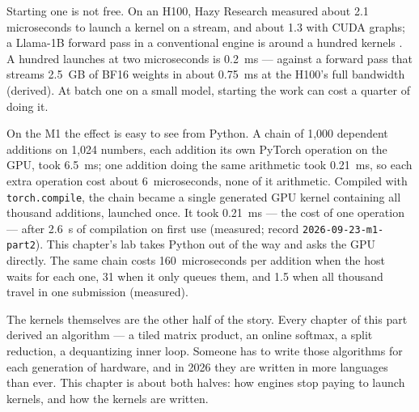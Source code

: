 Starting one is not free. On an H100, Hazy Research measured about 2.1
microseconds to launch a kernel on a stream, and about 1.3 with CUDA graphs;
a Llama-1B forward pass in a conventional engine is around a hundred kernels
\cite{spector2025megakernel}. A hundred launches at two microseconds is
0.2~ms --- against a forward pass that streams 2.5~GB of BF16 weights in about
0.75~ms at the H100's full bandwidth (derived). At batch one on a small model,
starting the work can cost a quarter of doing it.

On the M1 the effect is easy to see from Python. A chain of 1,000 dependent
additions on 1,024 numbers, each addition its own PyTorch operation on the
GPU, took 6.5~ms; one addition doing the same arithmetic took 0.21~ms, so each
extra operation cost about 6~microseconds, none of it arithmetic. Compiled
with \texttt{torch.compile}, the chain became a single generated GPU kernel
containing all thousand additions, launched once. It took 0.21~ms --- the cost
of one operation --- after 2.6~s of compilation on first use (measured; record
\texttt{2026-09-23-m1-part2}). This chapter's lab takes Python out of the way
and asks the GPU directly. The same chain costs 160~microseconds per addition
when the host waits for each one, 31 when it only queues them, and 1.5 when all
thousand travel in one submission (measured).

The kernels themselves are the other half of the story. Every chapter of this
part derived an algorithm --- a tiled matrix product, an online softmax, a
split reduction, a dequantizing inner loop. Someone has to write those
algorithms for each generation of hardware, and in 2026 they are written in
more languages than ever. This chapter is about both halves: how engines stop
paying to launch kernels, and how the kernels are written.



